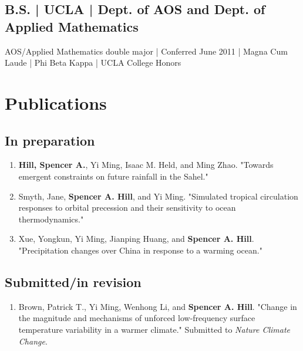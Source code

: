 \documentclass[12pt,letterpaper]{shillcv}
\begin{document}
\subsection*{B.S. | UCLA | Dept. of AOS and Dept. of Applied Mathematics}
\label{sec:org7ad625a}
AOS/Applied Mathematics double major | Conferred June 2011 |
Magna Cum Laude | Phi Beta Kappa | UCLA College Honors
\section*{Publications}
\label{sec:orgaa1554b}
\subsection*{In preparation}
\label{sec:org27b1342}
\begin{enumerate}
\item \textbf{Hill, Spencer A.}, Yi Ming, Isaac M. Held, and Ming Zhao.  "Towards emergent
constraints on future rainfall in the Sahel."
\item Smyth, Jane, \textbf{Spencer A. Hill}, and Yi Ming.  "Simulated tropical circulation
responses to orbital precession and their sensitivity to ocean
thermodynamics."
\item Xue, Yongkun, Yi Ming, Jianping Huang, and \textbf{Spencer A. Hill}.  "Precipitation
changes over China in response to a warming ocean."
\end{enumerate}
\subsection*{Submitted/in revision}
\label{sec:org1aa2ef8}
\begin{enumerate}
\item Brown, Patrick T., Yi Ming, Wenhong Li, and \textbf{Spencer A. Hill}.  "Change in the
magnitude and mechanisms of unforced low-frequency surface temperature
variability in a warmer climate."  Submitted to \emph{Nature Climate Change}.
\end{enumerate}
\end{document}
